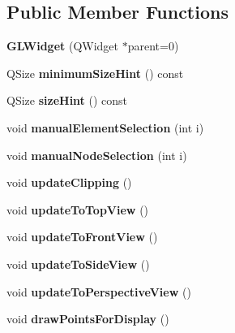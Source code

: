 \subsection*{Public Member Functions}
\begin{DoxyCompactItemize}
\item 
\hypertarget{classGLWidget_ab79c391c86de1ffb76f6950b49d82c0c}{}{\bfseries G\+L\+Widget} (Q\+Widget $\ast$parent=0)\label{classGLWidget_ab79c391c86de1ffb76f6950b49d82c0c}

\item 
\hypertarget{classGLWidget_ade3142625c1bfda0576e419b176cf8b1}{}Q\+Size {\bfseries minimum\+Size\+Hint} () const \label{classGLWidget_ade3142625c1bfda0576e419b176cf8b1}

\item 
\hypertarget{classGLWidget_a57698bc426052845b43a135a13540154}{}Q\+Size {\bfseries size\+Hint} () const \label{classGLWidget_a57698bc426052845b43a135a13540154}

\item 
\hypertarget{classGLWidget_ad425870ac081f6814c5bdb794e6e4c21}{}void {\bfseries manual\+Element\+Selection} (int i)\label{classGLWidget_ad425870ac081f6814c5bdb794e6e4c21}

\item 
\hypertarget{classGLWidget_a21f7a00a668f6ab6c5a9b1491e30c43e}{}void {\bfseries manual\+Node\+Selection} (int i)\label{classGLWidget_a21f7a00a668f6ab6c5a9b1491e30c43e}

\item 
\hypertarget{classGLWidget_ad569f9af7f5bbbfee5f1810d07107f20}{}void {\bfseries update\+Clipping} ()\label{classGLWidget_ad569f9af7f5bbbfee5f1810d07107f20}

\item 
\hypertarget{classGLWidget_adf09146230a2acda5a955acf59fbc653}{}void {\bfseries update\+To\+Top\+View} ()\label{classGLWidget_adf09146230a2acda5a955acf59fbc653}

\item 
\hypertarget{classGLWidget_ab4dcb3e931649a5f1edb6c6cede31075}{}void {\bfseries update\+To\+Front\+View} ()\label{classGLWidget_ab4dcb3e931649a5f1edb6c6cede31075}

\item 
\hypertarget{classGLWidget_a4930d77748cd175e349194da489c12d5}{}void {\bfseries update\+To\+Side\+View} ()\label{classGLWidget_a4930d77748cd175e349194da489c12d5}

\item 
\hypertarget{classGLWidget_afa3014a464a473c9ba62b22720f2d6fd}{}void {\bfseries update\+To\+Perspective\+View} ()\label{classGLWidget_afa3014a464a473c9ba62b22720f2d6fd}

\item 
\hypertarget{classGLWidget_af9b7537315485a04dd848ee62ac60b1e}{}void {\bfseries draw\+Points\+For\+Display} ()\label{classGLWidget_af9b7537315485a04dd848ee62ac60b1e}

\end{DoxyCompactItemize}
